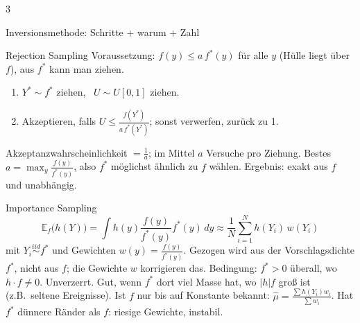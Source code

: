 \documentclass[8pt,a4paper,landscape]{extarticle}
\newcommand{\E}{\mathbb{E}}
\newcommand{\iid}{\overset{iid}{\sim}}
\begin{document}
\begin{multicols*}{3}
\begin{rechnen}{Inversionsmethode: Schritte + warum + Zahl}
\end{rechnen}
\begin{rechnen}{Rejection Sampling}
Voraussetzung: $f(y)\le a\,f^*(y)$ für alle $y$ (Hülle liegt über $f$), aus $f^*$ kann man ziehen.
\begin{enumerate}[leftmargin=10pt]
\item $Y^*\sim f^*$ ziehen, \ $U\sim U[0,1]$ ziehen.
\item Akzeptieren, falls $U\le\frac{f(Y^*)}{a\,f^*(Y^*)}$; sonst verwerfen, zurück zu 1.
\end{enumerate}
Akzeptanzwahrscheinlichkeit $=\frac1a$; im Mittel $a$ Versuche pro Ziehung. Bestes $a=\max_y\frac{f(y)}{f^*(y)}$, also $f^*$ möglichst ähnlich zu $f$ wählen. Ergebnis: exakt aus $f$ und unabhängig.
\end{rechnen}
\begin{rechnen}{Importance Sampling}
$$\E_f\big(h(Y)\big)=\int h(y)\frac{f(y)}{f^*(y)}f^*(y)\,dy\approx\frac1N\sum_{i=1}^N h(Y_i)\,w(Y_i)$$
mit $Y_i\iid f^*$ und Gewichten $w(y)=\frac{f(y)}{f^*(y)}$.
Gezogen wird aus der Vorschlagsdichte $f^*$, nicht aus $f$; die Gewichte $w$ korrigieren das. Bedingung: $f^*>0$ überall, wo $h\cdot f\neq 0$. Unverzerrt. Gut, wenn $f^*$ dort viel Masse hat, wo $|h|f$ groß ist (z.B.\ seltene Ereignisse). Ist $f$ nur bis auf Konstante bekannt: $\hat\mu=\frac{\sum h(Y_i)w_i}{\sum w_i}$. Hat $f^*$ dünnere Ränder als $f$: riesige Gewichte, instabil.
\end{rechnen}


\end{multicols*}
\end{document}
